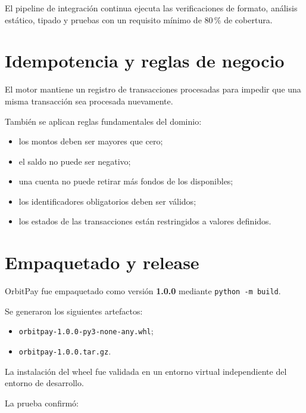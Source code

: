 \documentclass[11pt,a4paper]{article}
\begin{document}
El pipeline de integración continua ejecuta las verificaciones
de formato, análisis estático, tipado y pruebas con un requisito
mínimo de 80\,\% de cobertura.

\section{Idempotencia y reglas de negocio}

El motor mantiene un registro de transacciones procesadas para
impedir que una misma transacción sea procesada nuevamente.

También se aplican reglas fundamentales del dominio:

\begin{itemize}
    \item los montos deben ser mayores que cero;
    \item el saldo no puede ser negativo;
    \item una cuenta no puede retirar más fondos de los disponibles;
    \item los identificadores obligatorios deben ser válidos;
    \item los estados de las transacciones están restringidos a valores definidos.
\end{itemize}

\section{Empaquetado y release}

OrbitPay fue empaquetado como versión \textbf{1.0.0} mediante
\texttt{python -m build}.

Se generaron los siguientes artefactos:

\begin{itemize}
    \item \texttt{orbitpay-1.0.0-py3-none-any.whl};
    \item \texttt{orbitpay-1.0.0.tar.gz}.
\end{itemize}

La instalación del wheel fue validada en un entorno virtual
independiente del entorno de desarrollo.

La prueba confirmó:
\end{document}
